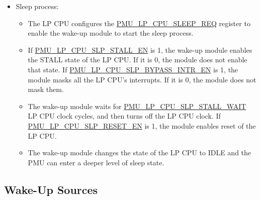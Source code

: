 \documentclass[main\_\_EN.tex]{subfiles}
\begin{document}
\begin{itemize}
    \item Sleep process:
    \begin{itemize}
    \item The LP CPU configures the \hyperref[fielddesc:PMULPCPUSLEEPREQ]{PMU\_LP\_CPU\_SLEEP\_REQ} register to enable the wake-up module to start the sleep process.
    \item If \hyperref[fielddesc:PMULPCPUSLPSTALLEN]{PMU\_LP\_CPU\_SLP\_STALL\_EN} is 1, the wake-up module enables the STALL state of the LP CPU. If it is 0, the module does not enable that state. If \hyperref[fielddesc:PMULPCPUSLPBYPASSINTREN]{PMU\_LP\_CPU\_SLP\_BYPASS\_INTR\_EN} is 1, the module masks all the LP CPU's interrupts. If it is 0, the module does not mask them.
    \item The wake-up module waits for \hyperref[fielddesc:PMULPCPUSLPSTALLWAIT]{PMU\_LP\_CPU\_SLP\_STALL\_WAIT} LP CPU clock cycles, and then turns off the LP CPU clock. If \hyperref[fielddesc:PMULPCPUSLPRESETEN]{PMU\_LP\_CPU\_SLP\_RESET\_EN} is 1, the module enables reset of the LP CPU.
    \item The wake-up module changes the state of the LP CPU to IDLE and the PMU can enter a deeper level of sleep state.
   \end{itemize}
   \end{itemize}

\subsection{Wake-Up Sources}
\end{document}
